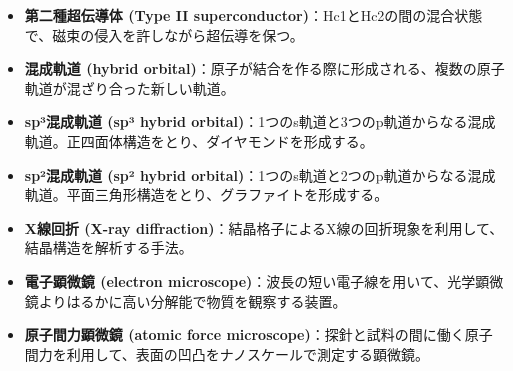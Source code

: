 \documentclass[11pt,a4paper]{ltjsarticle}
\begin{document}
\begin{itemize}
    \item \textbf{第二種超伝導体 (Type II superconductor)}：Hc1とHc2の間の混合状態で、磁束の侵入を許しながら超伝導を保つ。
    \item \textbf{混成軌道 (hybrid orbital)}：原子が結合を作る際に形成される、複数の原子軌道が混ざり合った新しい軌道。
    \item \textbf{sp³混成軌道 (sp³ hybrid orbital)}：1つのs軌道と3つのp軌道からなる混成軌道。正四面体構造をとり、ダイヤモンドを形成する。
    \item \textbf{sp²混成軌道 (sp² hybrid orbital)}：1つのs軌道と2つのp軌道からなる混成軌道。平面三角形構造をとり、グラファイトを形成する。
    \item \textbf{X線回折 (X-ray diffraction)}：結晶格子によるX線の回折現象を利用して、結晶構造を解析する手法。
    \item \textbf{電子顕微鏡 (electron microscope)}：波長の短い電子線を用いて、光学顕微鏡よりはるかに高い分解能で物質を観察する装置。
    \item \textbf{原子間力顕微鏡 (atomic force microscope)}：探針と試料の間に働く原子間力を利用して、表面の凹凸をナノスケールで測定する顕微鏡。
\end{itemize}
\end{document}
